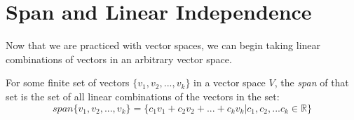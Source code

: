 \chapter{Span and Linear Independence}

Now that we are practiced with vector spaces, we can begin taking linear combinations of vectors in an arbitrary vector space.

 {
    For some finite set of vectors $\{v_1, v_2, ... , v_k\}$ in a vector space $V$, the \textit{span} of that set is the set of 
    all linear combinations of the vectors in the set: \newline 
    \[span\{v_1, v_2, ... , v_k\} = \{c_1v_1 + c_2v_2 + ... + c_kv_k | c_1, c_2, ... c_k \in \mathbb{R}\}\]
}